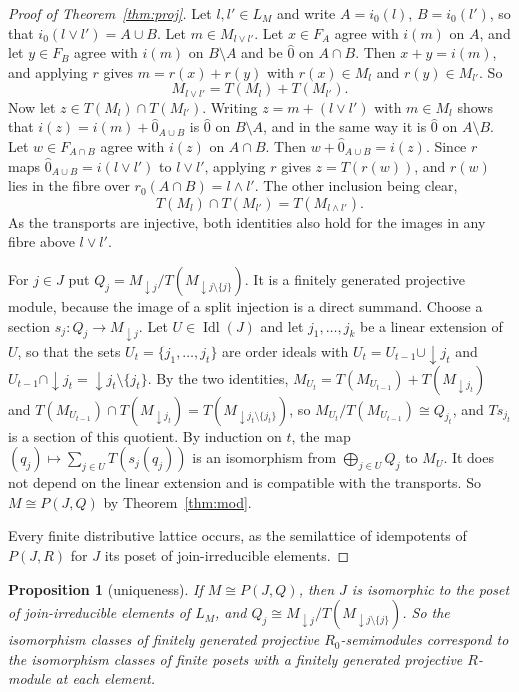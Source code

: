\documentclass[11pt]{amsart}
\newtheorem{proposition}[thm]{Proposition}
\theoremstyle{remark}
\newcommand{\oz}{\widehat{0}}
\DeclareMathOperator{\Idl}{Idl}
\begin{document}
\begin{proof}[Proof of Theorem~\ref{thm:proj}]
Let $l,l'\in L_M$ and write $A=i_0(l)$, $B=i_0(l')$, so that $i_0(l\vee l')=A\cup B$. Let $m\in M_{l\vee l'}$. Let $x\in F_A$ agree with $i(m)$ on $A$, and let $y\in F_B$ agree with $i(m)$ on $B\setminus A$ and be $\oz$ on $A\cap B$. Then $x+y=i(m)$, and applying $r$ gives $m=r(x)+r(y)$ with $r(x)\in M_l$ and $r(y)\in M_{l'}$. So
\[
M_{l\vee l'}=T(M_l)+T(M_{l'}).
\]
Now let $z\in T(M_l)\cap T(M_{l'})$. Writing $z=m+(l\vee l')$ with $m\in M_l$ shows that $i(z)=i(m)+\oz_{A\cup B}$ is $\oz$ on $B\setminus A$, and in the same way it is $\oz$ on $A\setminus B$. Let $w\in F_{A\cap B}$ agree with $i(z)$ on $A\cap B$. Then $w+\oz_{A\cup B}=i(z)$. Since $r$ maps $\oz_{A\cup B}=i(l\vee l')$ to $l\vee l'$, applying $r$ gives $z=T(r(w))$, and $r(w)$ lies in the fibre over $r_0(A\cap B)=l\wedge l'$. The other inclusion being clear,
\[
T(M_l)\cap T(M_{l'})=T(M_{l\wedge l'}).
\]
As the transports are injective, both identities also hold for the images in any fibre above $l\vee l'$.

For $j\in J$ put $Q_j=M_{{\downarrow}j}/T(M_{{\downarrow}j\setminus\{j\}})$. It is a finitely generated projective module, because the image of a split injection is a direct summand. Choose a section $s_j\colon Q_j\to M_{{\downarrow}j}$. Let $U\in\Idl(J)$ and let $j_1,\dots,j_k$ be a linear extension of $U$, so that the sets $U_t=\{j_1,\dots,j_t\}$ are order ideals with $U_t=U_{t-1}\cup{\downarrow}j_t$ and $U_{t-1}\cap{\downarrow}j_t={\downarrow}j_t\setminus\{j_t\}$. By the two identities, $M_{U_t}=T(M_{U_{t-1}})+T(M_{{\downarrow}j_t})$ and $T(M_{U_{t-1}})\cap T(M_{{\downarrow}j_t})=T(M_{{\downarrow}j_t\setminus\{j_t\}})$, so $M_{U_t}/T(M_{U_{t-1}})\cong Q_{j_t}$, and $T s_{j_t}$ is a section of this quotient. By induction on $t$, the map $(q_j)\mapsto\sum_{j\in U}T(s_j(q_j))$ is an isomorphism from $\bigoplus_{j\in U}Q_j$ to $M_U$. It does not depend on the linear extension and is compatible with the transports. So $M\cong P(J,Q)$ by Theorem~\ref{thm:mod}.

Every finite distributive lattice occurs, as the semilattice of idempotents of $P(J,R)$ for $J$ its poset of join-irreducible elements.
\end{proof}

\begin{proposition}[uniqueness]\label{prop:unique}
If $M\cong P(J,Q)$, then $J$ is isomorphic to the poset of join-irreducible elements of $L_M$, and $Q_j\cong M_{{\downarrow}j}/T(M_{{\downarrow}j\setminus\{j\}})$. So the isomorphism classes of finitely generated projective $R_0$-semimodules correspond to the isomorphism classes of finite posets with a finitely generated projective $R$-module at each element.
\end{proposition}
\end{document}
